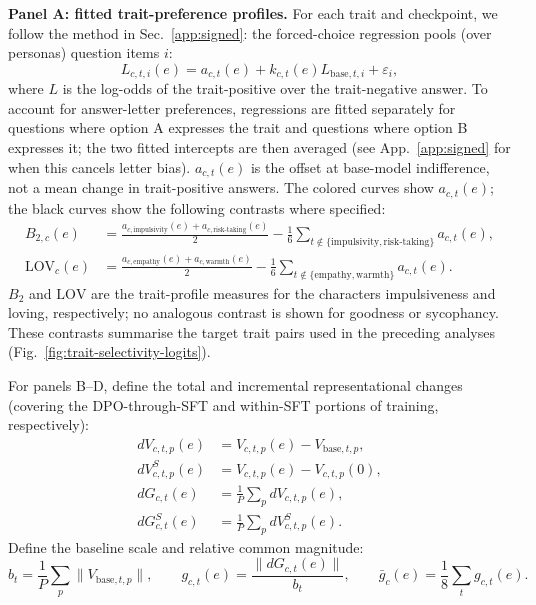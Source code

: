 \documentclass{article}
\begin{document}
\noindent\textbf{Panel A: fitted trait-preference profiles.}
For each trait and checkpoint, we follow the method in Sec.~\ref{app:signed}:
 the forced-choice regression
pools (over personas) question items $i$:
\begin{equation}
L_{c,t,i}(e)
 = a_{c,t}(e)+k_{c,t}(e)L_{\mathrm{base},t,i}
   +\varepsilon_i,
\end{equation}
where $L$ is the log-odds of the trait-positive over the
trait-negative answer. To account for answer-letter preferences, regressions are fitted separately for questions where option A expresses the trait and questions where option B expresses it; the two fitted intercepts are then averaged (see App.~\ref{app:signed} for when this cancels letter bias). $a_{c,t}(e)$ is the offset at base-model indifference, not a mean change in trait-positive answers.
The colored curves show $a_{c,t}(e)$; the black curves
show the following contrasts where specified:
\begin{align}
B_{2,c}(e)
 &= \frac{a_{c,\mathrm{impulsivity}}(e)
          +a_{c,\mathrm{risk\text{-}taking}}(e)}{2}
    -\frac16\sum_{t\notin
       \{\mathrm{impulsivity},\mathrm{risk\text{-}taking}\}}
       a_{c,t}(e), \\
\mathrm{LOV}_c(e)
 &= \frac{a_{c,\mathrm{empathy}}(e)
          +a_{c,\mathrm{warmth}}(e)}{2}
    -\frac16\sum_{t\notin
       \{\mathrm{empathy},\mathrm{warmth}\}}a_{c,t}(e).
\end{align}
$B_2$ and $\mathrm{LOV}$ are the trait-profile measures for the characters impulsiveness and loving, respectively; no analogous contrast is shown for goodness or sycophancy. These contrasts summarise the target trait pairs used in the preceding analyses (Fig.~\ref{fig:trait-selectivity-logits}).

For panels B--D, define the total and incremental
representational changes (covering the DPO-through-SFT and within-SFT portions of training, respectively):
\begin{align}
dV_{c,t,p}(e)
 &= V_{c,t,p}(e)-V_{\mathrm{base},t,p}, \\
dV^{S}_{c,t,p}(e)
 &= V_{c,t,p}(e)-V_{c,t,p}(0), \\
dG_{c,t}(e)
 &= \frac1P\sum_p dV_{c,t,p}(e), \\
dG^{S}_{c,t}(e)
 &= \frac1P\sum_p dV^{S}_{c,t,p}(e).
\end{align}
Define the baseline scale and relative common magnitude:
\begin{equation}
b_t=\frac1P\sum_p\|V_{\mathrm{base},t,p}\|,
\qquad
g_{c,t}(e)=\frac{\|dG_{c,t}(e)\|}{b_t},
\qquad
\bar g_c(e)=\frac18\sum_t g_{c,t}(e).
\end{equation}
\end{document}
